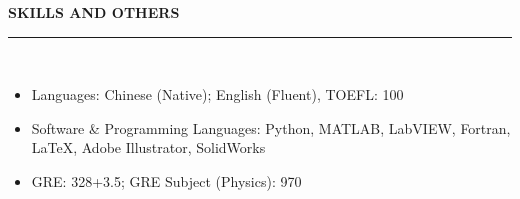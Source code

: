 \documentclass[letterpaper,11pt]{article}
\begin{document}
{\Large\bfseries{}SKILLS AND OTHERS}\\
\rule[1.5ex]{\columnwidth}{1pt}\\
\vspace{-5ex}
\begin{itemize}
    \item Languages: Chinese (Native); English (Fluent), TOEFL: 100
    \item Software \& Programming Languages: Python, MATLAB, LabVIEW, Fortran, \LaTeX, Adobe Illustrator, SolidWorks
    \item GRE: 328+3.5; GRE Subject (Physics): 970
\end{itemize}
\end{document}
